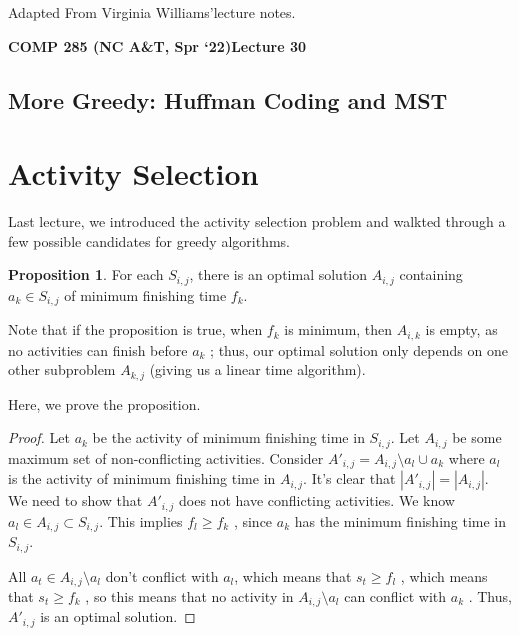 \documentclass [12pt]{article}
\theoremstyle{definition}
\newtheorem{proposition}{Proposition}
\begin{document}
 

\vspace {1em} 
\begin {Instruction} 
Adapted From Virginia Williams'lecture notes.
\end {Instruction}  

{\LARGE \textbf {COMP 285 (NC A\&T, Spr `22)}\hfill \textbf {Lecture 30} } 

\begin{centering}
\section*{More Greedy: Huffman Coding and MST}
\end{centering}


\section{Activity Selection}

Last lecture, we introduced the activity selection problem and walkted through a few possible candidates for greedy algorithms.

\begin{proposition}
For each $S_{i ,j}$, there is an optimal solution $A_{i ,j}$ containing $a_k \in S_{i ,j}$ of minimum finishing time $f_k$.
\end{proposition}
 

Note that if the proposition is true, when $f_k$ is minimum, then $A_{i ,k}$ is empty, as no activities can finish before $a_k$ ; thus, our optimal solution only depends on one other subproblem $A_{k ,j}$ (giving us a linear time algorithm). 


Here, we prove the proposition.

\begin{proof}

Let $a_k$ be the activity of minimum finishing time in $S_{i ,j}$. Let $A_{i ,j}$ be some maximum set of non-conflicting activities. Consider $A'_{i ,j} = A_{i ,j} \setminus {a_l} \cup {a_k}$ where $a_l$ is the activity of minimum finishing time in $A_{i ,j}$. It's clear that $|A'_{i ,j}| = |A_{i ,j}|$. We need to show that $A'_{i ,j}$ does not have conflicting activities. We know $a_l \in A_{i ,j} \subset S_{i ,j}$. This implies $f_l \geq f_k$ , since $a_k$ has the minimum finishing time in $S_{i ,j}$. 

All $a_t \in A_{i ,j} \setminus {a_l}$ don't conflict with $a_l $, which means that $s_t \geq f_l$ , which means that $s_t \geq f_k$ , so this means that no activity in $A_{i ,j} \setminus {a_l}$ can conflict with $a_k$ . Thus, $A'_{i ,j}$ is an optimal solution.
\end{proof}
\end{document}
